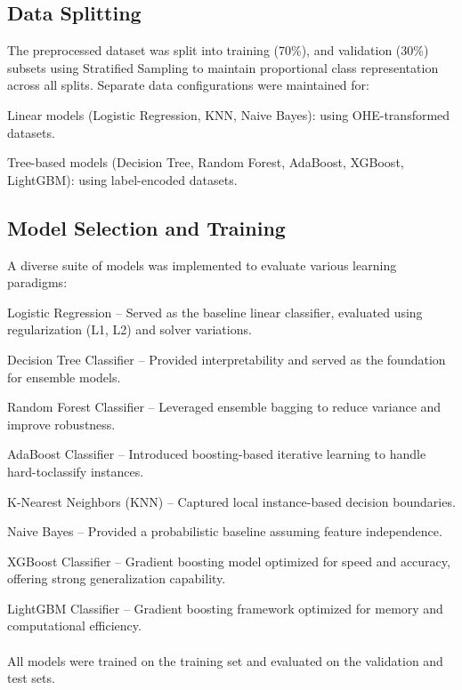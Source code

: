 \subsection{Data Splitting}\label{subsec:data-splitting}
The preprocessed dataset was split into training (70\%), and validation (30\%) subsets using Stratified Sampling to maintain proportional class representation across all splits.
Separate data configurations were maintained for:

Linear models (Logistic Regression, KNN, Naive Bayes): using OHE-transformed datasets.

Tree-based models (Decision Tree, Random Forest, AdaBoost, XGBoost, LightGBM): using label-encoded datasets.


\subsection{Model Selection and Training}\label{subsec:model-selection-and-training}
A diverse suite of models was implemented to evaluate various learning paradigms:

Logistic Regression – Served as the baseline linear classifier, evaluated using regularization (L1, L2) and solver variations.

Decision Tree Classifier – Provided interpretability and served as the foundation for ensemble models.

Random Forest Classifier – Leveraged ensemble bagging to reduce variance and improve robustness.

AdaBoost Classifier – Introduced boosting-based iterative learning to handle hard-toclassify instances.

K-Nearest Neighbors (KNN) – Captured local instance-based decision boundaries.

Naive Bayes – Provided a probabilistic baseline assuming feature independence.

XGBoost Classifier – Gradient boosting model optimized for speed and accuracy, offering strong generalization capability.

LightGBM Classifier – Gradient boosting framework optimized for memory and computational efficiency.
\\ \\
All models were trained on the training set and evaluated on the validation and test sets.


